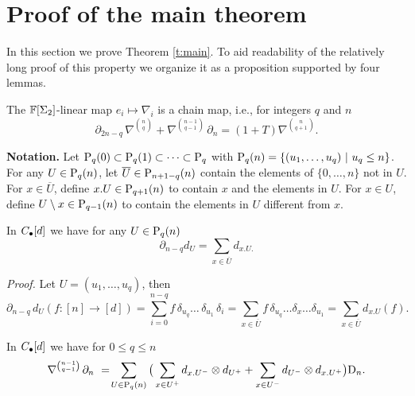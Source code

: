 
\section{Proof of the main theorem} \label{s:proof}

In this section we prove Theorem \ref{t:main}.
To aid readability of the relatively long proof of this property we organize it as a proposition supported by four lemmas.
	
\begin{proposition} \label{proposition: chain map}
	The $\F[\Sigma_2]$-linear map $e_i \mapsto \nabla_i$ is a chain map, i.e., for integers $q$ and $n$
	\begin{equation} \label{proposition2: existence: eq1}
	\partial_{2n-q}\,\nabla^{n \choose q} + \nabla^{n-1 \choose q-1}\,\partial_n = (1+T)\nabla^{n \choose q+1}.
	\end{equation}
\end{proposition}

\textbf{Notation.} Let $\P_q(0) \subset \P_q(1) \subset \cdots \subset \P_q $ with \mbox{$\P_q(n) = \{(u_1, \dots, u_q)\ |\ u_q \leq n\}$}. For any $U \in \P_q(n)$, let $\overline{U} \in \P_{n+1-q}(n)$ contain the elements of $\{0, \dots, n\}$ not in $U$. For $x \in \overline{U}$, define $x.U \in \P_{q+1}(n)$ to contain $x$ and the elements in $U$. For $x \in U$, define $U \setminus x \in \P_{q-1}(n)$ to contain the elements in $U$ different from $x$. 

\begin{lemma} \label{lemma1: existence}
	In $\chains[d]$ we have for any $U \in \P_{q}(n)$
	\begin{equation} \label{lemma1: existence: eq1}
	\partial_{n-q} d_U = \sum_{x \in \overline{U}} d_{x.U.}
	\end{equation}
\end{lemma}

\textit{Proof.}
Let $U = (u_1, \dots, u_q)$, then
\begin{equation*}
\partial_{n-q}\, d_U (f : [n] \to [d]) = 
\sum_{i=0}^{n-q} f\, \delta_{u_q} \dots \,\delta_{u_1}\, \delta_i = 
\sum_{x \in \overline{U}} f\, \delta_{u_q} \dots \delta_x \dots \delta_{u_1} = 
\sum_{x \in \overline{U}} d_{x.U} (f).
\end{equation*}

\begin{lemma} \label{lemma2: existence}
	In $\chains[d]$ we have for $0 \leq q \leq n$
	\begin{equation} \label{lemma2: existence: eq1}
	\nabla^{ n-1 \choose q-1}\, \partial_n\ =\! \sum_{U \in \P_q(n)} \big( 
	\sum_{x \in U^+} d_{x.U^-} \tensor d_{U^+} + 
	\sum_{x \in U^-} d_{U^-} \tensor d_{x.U^+} \big) \D_n.
	\end{equation}
\end{lemma}

